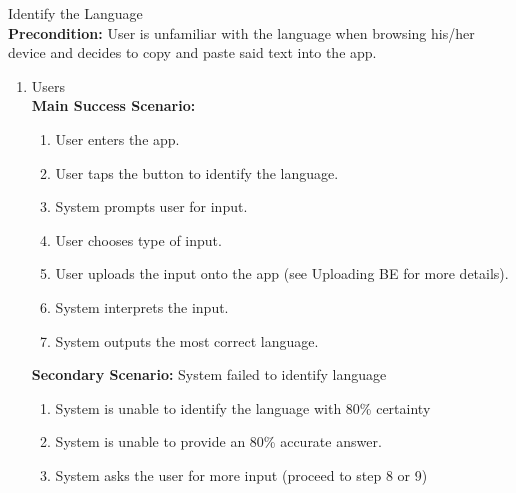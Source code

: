 \item Identify the Language \\
	\textbf{Precondition:} User is unfamiliar with the language when browsing his/her device and decides to copy and paste said text into the app.
	\begin{enumerate}[{\bf VP1:}]
		\item Users \\
				\textbf{Main Success Scenario:}
					\begin{enumerate}[{\bf 1.}]
						\item User enters the app.
						\item User taps the button to identify the language.
							\item System prompts user for input.
							\item User chooses type of input.
							\item User uploads the input onto the app (see Uploading BE for more details).
							\item System interprets the input.
							\item System outputs the most correct language.
					\end{enumerate}
					\textbf{Secondary Scenario:} System failed to identify language
					\begin{enumerate}[{\bf 7.}i.]
						\item  System is unable to identify the language with 80\% certainty
						\item System is unable to provide an 80\% accurate answer.
						\item System asks the user for more input (proceed to step 8 or 9)
					\end{enumerate}
					

\end{enumerate}
